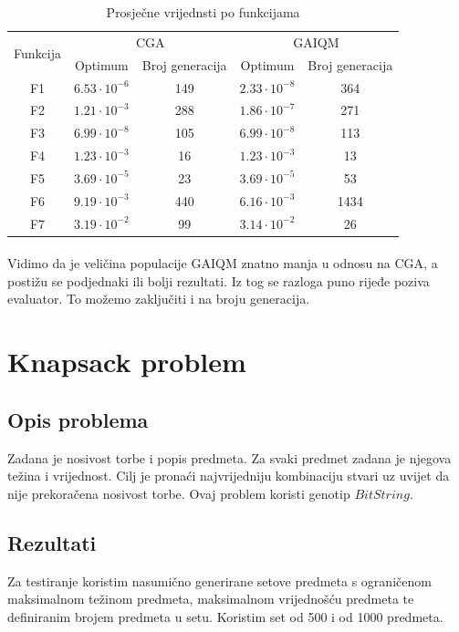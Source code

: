 \documentclass[times, utf8, zavrsni, numeric]{fer}
\begin{document}
\begin{table}[htb]
\caption{Prosječne vrijednsti po funkcijama}
\centering
\begin{tabular}{|c|cc|cc|} \hline
\multirow{2}{*}{Funkcija} & \multicolumn{2}{c|}{CGA} & \multicolumn{2}{c|}{GAIQM} \\ \cline{2-5}
 & Optimum & Broj generacija & Optimum & Broj generacija \\ 
\hline
F1 & $6.53\cdot 10^{-6}$ & 149 & $2.33\cdot 10^{-8}$ & 364 \\
F2 & $1.21\cdot 10^{-3}$ & 288 & $1.86\cdot 10^{-7}$ & 271 \\
F3 & $6.99\cdot 10^{-8}$ & 105 & $6.99\cdot 10^{-8}$ & 113 \\
F4 & $1.23\cdot 10^{-3}$ & 16 & $1.23\cdot 10^{-3}$ & 13 \\
F5 & $3.69\cdot 10^{-5}$ & 23 & $3.69\cdot 10^{-5}$ & 53 \\
F6 & $9.19\cdot 10^{-3}$ & 440 & $6.16\cdot 10^{-3}$ & 1434 \\
F7 & $3.19\cdot 10^{-2}$ & 99 & $3.14\cdot 10^{-2}$ & 26 \\
\hline
\end{tabular}
\end{table}

\paragraph{}
Vidimo da je veličina populacije GAIQM znatno manja u odnosu na CGA, a postižu se podjednaki ili bolji rezultati. Iz tog se razloga puno rijeđe poziva evaluator. To možemo zaključiti i na broju generacija.

\clearpage

\section{Knapsack problem}
\subsection{Opis problema}
Zadana je nosivost torbe  i popis predmeta. Za svaki predmet zadana je njegova težina i vrijednost.
Cilj je pronaći najvrijedniju kombinaciju stvari uz uvijet da nije prekoračena nosivost torbe.
Ovaj problem koristi genotip $BitString$.


\subsection{Rezultati}
Za testiranje koristim nasumično generirane setove predmeta s ograničenom maksimalnom težinom predmeta, maksimalnom vrijednošću predmeta te definiranim brojem predmeta u setu. Koristim set od 500 i od 1000 predmeta.
\end{document}
